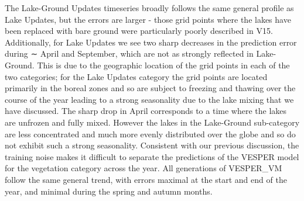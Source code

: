 \documentclass[hess, twostagejnl]{copernicus}
\begin{document}
The Lake-Ground Updates timeseries broadly follows the same general profile as Lake Updates, but the errors are larger - those grid points where the lakes have been replaced with bare ground were particularly poorly described in V15. Additionally, for Lake Updates we see two sharp decreases in the prediction error during ∼ April and September, which are not as strongly reflected in Lake-Ground. This is due to the geographic location of the grid points in each of the two categories; for the Lake Updates category the grid points are located primarily in the boreal zones and so are subject to freezing and thawing over the course of the year leading to a strong seasonality due to the lake mixing that we have discussed. The sharp drop in April corresponds to a time where the lakes are unfrozen and fully mixed. However the lakes in the Lake-Ground sub-category are less concentrated and much more evenly distributed over the globe and so do not exhibit such a strong seasonality. Consistent with our previous discussion, the training noise makes it difficult to separate the predictions of the VESPER model for the vegetation category across the year. All generations of VESPER\_VM follow the same general trend, with errors maximal at the start and end of the year, and minimal during the spring and autumn months. \newline 


\end{document}
